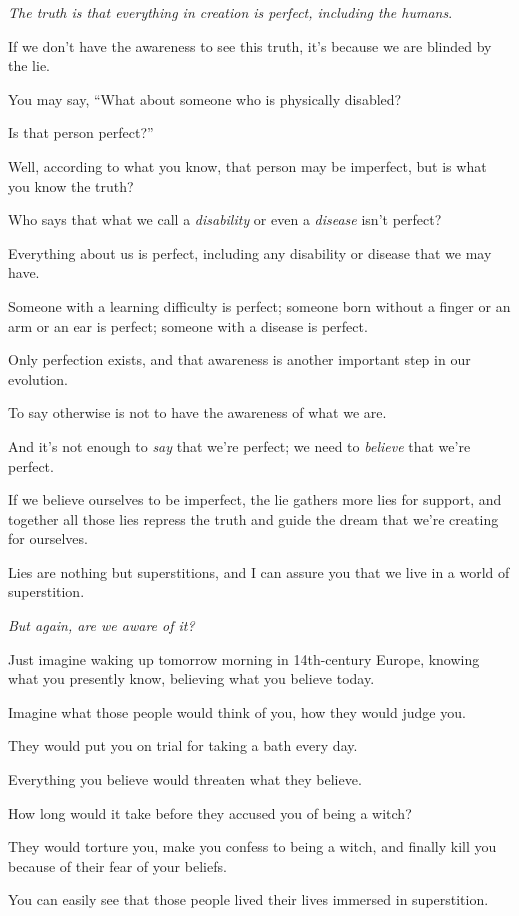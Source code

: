 \documentclass{article}
\numberwithin{equation}{section}
\begin{document}
\textit{The truth is that everything in creation is perfect, including the humans}.

If we don't have the awareness to see this truth, it's because we are blinded by the lie.

You may say, ``What about someone who is physically disabled?

Is that person perfect?''

Well, according to what you know, that person may be imperfect, but is what you know the truth?

Who says that what we call a \textit{disability} or even a \textit{disease} isn't perfect?

%
Everything about us is perfect, including any disability or disease that we may have.

Someone with a learning difficulty is perfect; someone born without a finger or an arm or an ear is perfect; someone with a disease is perfect.

Only perfection exists, and that awareness is another important step in our evolution.

To say otherwise is not to have the awareness of what we are.

And it's not enough to \textit{say} that we're perfect; we need to \textit{believe} that we're perfect.

If we believe ourselves to be imperfect, the lie gathers more lies for support, and together all those lies repress the truth and guide the dream that we're creating for ourselves.

Lies are nothing but superstitions, and I can assure you that we live in a world of superstition.

\textit{But again, are we aware of it?}

%
Just imagine waking up tomorrow morning in 14th-century Europe, knowing what you presently know, believing what you believe today.

Imagine what those people would think of you, how they would judge you.

They would put you on trial for taking a bath every day.

Everything you believe would threaten what they believe.

How long would it take before they accused you of being a witch?

They would torture you, make you confess to being a witch, and finally kill you because of their fear of your beliefs.

You can easily see that those people lived their lives immersed in superstition.
\end{document}
